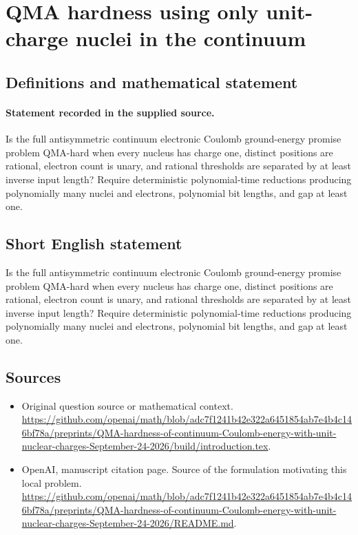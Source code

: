 \documentclass[11pt]{article}
\begin{document}
\section*{QMA hardness using only unit-charge nuclei in the continuum}\label{statement}
\subsection{Definitions and mathematical statement}
\paragraph{Statement recorded in the supplied source.}
Is the full antisymmetric continuum electronic Coulomb ground-energy promise problem QMA-hard when every nucleus has charge one, distinct positions are rational, electron count is unary, and rational thresholds are separated by at least inverse input length? Require deterministic polynomial-time reductions producing polynomially many nuclei and electrons, polynomial bit lengths, and gap at least one.
\subsection{Short English statement}
Is the full antisymmetric continuum electronic Coulomb ground-energy promise problem QMA-hard when every nucleus has charge one, distinct positions are rational, electron count is unary, and rational thresholds are separated by at least inverse input length? Require deterministic polynomial-time reductions producing polynomially many nuclei and electrons, polynomial bit lengths, and gap at least one.
\subsection{Sources}
\begin{itemize}
\item[S1] Original question source or mathematical context.
\url{https://github.com/openai/math/blob/adc7f1241b42e322a6451854ab7e4b4c146bf78a/preprints/QMA-hardness-of-continuum-Coulomb-energy-with-unit-nuclear-charges-September-24-2026/build/introduction.tex}.
\item[S2] OpenAI, manuscript citation page. Source of the formulation motivating this local problem.
\url{https://github.com/openai/math/blob/adc7f1241b42e322a6451854ab7e4b4c146bf78a/preprints/QMA-hardness-of-continuum-Coulomb-energy-with-unit-nuclear-charges-September-24-2026/README.md}.
\end{itemize}
\end{document}
